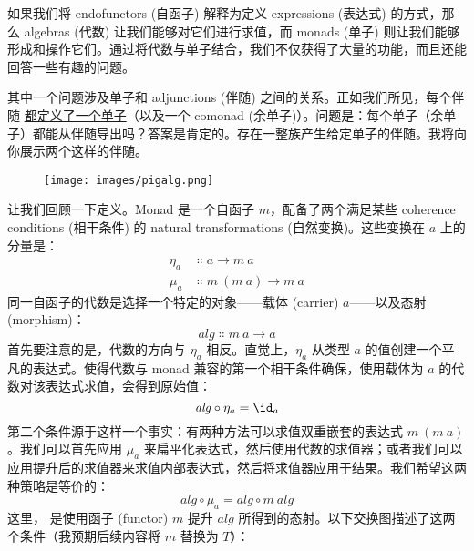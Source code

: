 
\lettrine[lhang=0.17]{如}{果我们将} endofunctors (自函子) 解释为定义 expressions (表达式) 的方式，那么 algebras (代数) 让我们能够对它们进行求值，而 monads (单子) 则让我们能够形成和操作它们。通过将代数与单子结合，我们不仅获得了大量的功能，而且还能回答一些有趣的问题。

其中一个问题涉及单子和 adjunctions (伴随) 之间的关系。正如我们所见，每个伴随 \hyperref[monads-categorically]{都定义了一个单子}（以及一个 comonad (余单子)）。问题是：每个单子（余单子）都能从伴随导出吗？答案是肯定的。存在一整族产生给定单子的伴随。我将向你展示两个这样的伴随。

\begin{figure}[H]
  \centering
  \texttt{[image: images/pigalg.png]}
\end{figure}

\noindent
让我们回顾一下定义。Monad 是一个自函子 $m$，配备了两个满足某些 coherence conditions (相干条件) 的 natural transformations (自然变换)。这些变换在 $a$ 上的分量是：
\begin{align*}
  \eta_a & \Colon a \to m\ a         \\
  \mu_a  & \Colon m\ (m\ a) \to m\ a
\end{align*}
同一自函子的代数是选择一个特定的对象——载体 (carrier) $a$——以及态射 (morphism)：
\[\mathit{alg} \Colon m\ a \to a\]
首先要注意的是，代数的方向与 $\eta_a$ 相反。直觉上，$\eta_a$ 从类型 $a$ 的值创建一个平凡的表达式。使得代数与 monad 兼容的第一个相干条件确保，使用载体为 $a$ 的代数对该表达式求值，会得到原始值：
\[\mathit{alg} \circ \eta_a = \id_a\]
第二个条件源于这样一个事实：有两种方法可以求值双重嵌套的表达式 $m\ (m\ a)$。我们可以首先应用 $\mu_a$ 来扁平化表达式，然后使用代数的求值器；或者我们可以应用提升后的求值器来求值内部表达式，然后将求值器应用于结果。我们希望这两种策略是等价的：
\[\mathit{alg} \circ \mu_a = \mathit{alg} \circ m\ \mathit{alg}\]
这里， 是使用函子 (functor) $m$ 提升 $\mathit{alg}$ 所得到的态射。以下交换图描述了这两个条件（我预期后续内容将 $m$ 替换为 $T$）：

\begin{figure}[H]
  \centering
  \begin{subfigure}
    \centering
  \end{subfigure}
  \hspace{1cm}
  \begin{subfigure}
    \centering
  \end{subfigure}
\end{figure}

